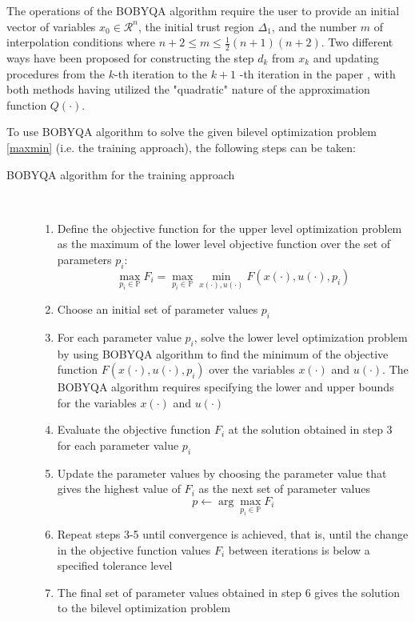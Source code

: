 \documentclass  [
  paper    = a4,
  BCOR     = 10mm,
  twoside,
  fontsize = 12pt,
  fleqn,
  toc      = bibnumbered,
  toc      = listofnumbered,
  numbers  = noendperiod,
  headings = normal,
  listof   = leveldown,
  version  = 3.03
]                                       {scrreprt}
\newcommand{\<}{\langle}
\renewcommand{\>}{\rangle}
\begin{document}
The operations of the BOBYQA algorithm require the user to provide an initial vector of variables $x_0 \in \mathcal{R}^n$, the initial trust region $\Delta_1$, and the number $m$ of interpolation conditions where $n+2 \leq m \leq \frac{1}{2}(n+1)(n+2)$. Two different ways have been proposed for constructing the step $d_k$ from $x_k$ and updating procedures from the $k$-th iteration to the $k+1$ -th iteration in the paper \cite{MicPow09}, with both methods having utilized the "quadratic" nature of the approximation function $Q(\cdot)$.


To use BOBYQA algorithm to solve the given bilevel optimization problem \ref{maxmin} (i.e. the training approach), the following steps can be taken:

\begin{description}
	\item[BOBYQA algorithm for the training approach]\ 
	\begin{enumerate}		
		\item Define the objective function for the upper level optimization problem as the maximum of the lower level objective function over the set of parameters $p_i$:
		\begin{equation}
			\max_{p_i \in \mathbb{P}} F_i = \max_{p_i \in \mathbb{P}} \min_{x(\cdot), u(\cdot)} F(x(\cdot), u(\cdot), p_i)
		\end{equation}
		\item Choose an initial set of parameter values $p_i$
		\item For each parameter value $p_i$, solve the lower level optimization problem by using BOBYQA algorithm to find the minimum of the objective function $F(x(\cdot), u(\cdot), p_i)$ over the variables $x(\cdot)$ and $u(\cdot)$. The BOBYQA algorithm requires specifying the lower and upper bounds for the variables $x(\cdot)$ and $u(\cdot)$
		\item Evaluate the objective function $F_i$ at the solution obtained in step 3 for each parameter value $p_i$
		\item Update the parameter values by choosing the parameter value that gives the highest value of $F_i$ as the next set of parameter values
		\begin{equation}
			p \leftarrow \arg\max_{p_i \in \mathbb{P}} F_i
		\end{equation}
		\item Repeat steps 3-5 until convergence is achieved, that is, until the change in the objective function values $F_i$ between iterations is below a specified tolerance level
		\item The final set of parameter values obtained in step 6 gives the solution to the bilevel optimization problem
	\end{enumerate}
\end{description}
\end{document}
